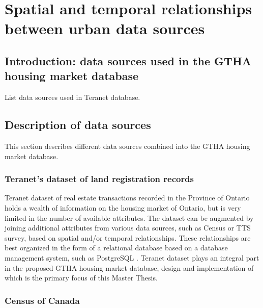 
\chapter{Spatial and temporal relationships between urban data sources} \label{ch:spatial_and_temporal_relationships_between_urban_data}

\section{Introduction: data sources used in the GTHA housing market database} \label{sec:intro_data_sources}

List data sources used in Teranet database.

\section{Description of data sources} \label{sec:description_of_data_sources}

This section describes different data sources combined into the GTHA housing market database.

\subsection{Teranet's dataset of land registration records} \label{subsec:teranet_description}

Teranet dataset of real estate transactions recorded in the Province of Ontario holds a wealth of information on the housing market of Ontario, but is very limited in the number of available attributes.
The dataset can be augmented by joining additional attributes from various data sources, such as Census or TTS survey, based on spatial and/or temporal relationships.
These relationships are best organized in the form of a relational database based on a database management system, such as PostgreSQL .
Teranet dataset plays an integral part in the proposed GTHA housing market database, design and implementation of which is the primary focus of this Master Thesis.

\subsection{Census of Canada} \label{subsec:census_description}

